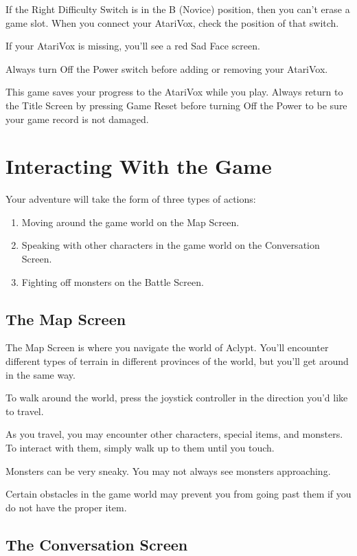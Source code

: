 \documentclass[10pt,twoside,openright]{memoir}
\begin{document}
If the Right  Difficulty Switch is in the B  (Novice) position, then you
can't  erase a  game slot.  When you  connect your  AtariVox, check  the
position of that switch.

If your AtariVox is missing, you'll see a red Sad Face screen.

Always   turn  Off   the  Power   switch  before   adding  or   removing
your AtariVox.

This game saves your progress to the AtariVox while you play.  Always
return to the Title Screen by pressing Game Reset before turning Off
the Power to be sure your game record is not damaged.


\chapter{Interacting With the Game}

Your adventure will take the form of three types of actions:

\begin{enumerate}
\item Moving around the game world on the Map Screen.
\item Speaking with other characters in the game world on the
  Conversation Screen.
\item Fighting off monsters on the Battle Screen.
\end{enumerate}

\section{The Map Screen}

The Map Screen is where you navigate the world of Aclypt. You'll
encounter different types of terrain in different provinces of the
world, but you'll get around in the same way.

To walk around the world, press the joystick controller in the
direction you'd like to travel.

As you travel, you may encounter other characters, special items, and
monsters. To interact with them, simply walk up to them until you
touch.

Monsters can be very sneaky. You may not always see monsters
approaching.

Certain obstacles in the game world may prevent you from going past
them if you do not have the proper item.

\section{The Conversation Screen}
\end{document}
